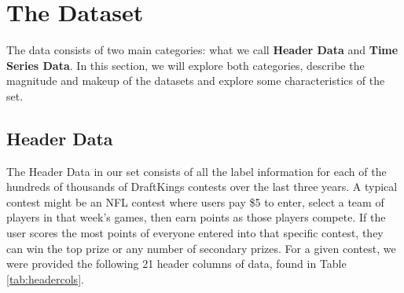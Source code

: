 \section{The Dataset}

The data consists of two main categories: what we call \textbf{Header Data} and \textbf{Time Series Data}. In this section, we will explore both categories, describe the magnitude and makeup of the datasets and explore some characteristics of the set.

\subsection{Header Data}

The Header Data in our set consists of all the label information for each of the hundreds of thousands of DraftKings contests over the last three years. A typical contest might be an NFL contest where users pay \$5 to enter, select a team of players in that week's games, then earn points as those players compete. If the user scores the most points of everyone entered into that specific contest, they can win the top prize or any number of secondary prizes. For a given contest, we were provided the following 21 header columns of data, found in Table \ref{tab:headercols}. 

